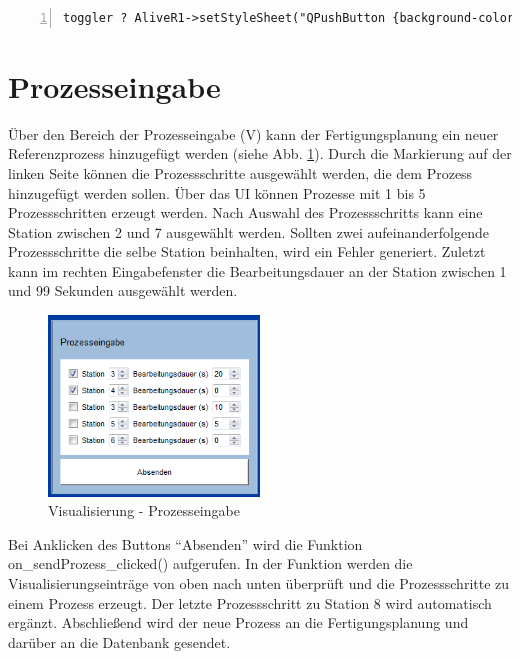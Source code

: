 \begin{lstlisting}[frame=single, breaklines=true, numbers=left, stepnumber=2, firstnumber=1, numberstyle = \tiny, caption=Stylesheet Aktualisierung der Alive-LED ,label=lst:LEDtoggle]
toggler ? AliveR1->setStyleSheet("QPushButton {background-color: rgb(0,250,50); border-radius: 6px;}") : AliveR1->setStyleSheet("QPushButton {background-color: green; border-radius: 6px;}");
\end{lstlisting}

\section{Prozesseingabe}
\label{sec:Prozesseingabe}

Über den Bereich der Prozesseingabe (V) kann der Fertigungsplanung ein neuer Referenzprozess hinzugefügt werden (siehe Abb. \ref{fig:Prozesseingabe}). Durch die Markierung auf der linken Seite können die Prozessschritte ausgewählt werden, die dem Prozess hinzugefügt werden sollen. Über das UI können Prozesse mit 1 bis 5 Prozessschritten erzeugt werden. Nach Auswahl des Prozessschritts kann eine Station zwischen 2 und 7 ausgewählt werden. Sollten zwei aufeinanderfolgende Prozessschritte die selbe Station beinhalten, wird ein Fehler generiert. Zuletzt kann im rechten Eingabefenster die Bearbeitungsdauer an der Station zwischen 1 und 99 Sekunden ausgewählt werden.

\begin{figure}[htb]
    \centering
    \includegraphics[width=0.5\textwidth]{Abbildungen/Prozesseingabe.png}
    \caption{Visualisierung - Prozesseingabe}		
    \label{fig:Prozesseingabe}
\end{figure}

Bei Anklicken des Buttons "`Absenden"' wird die Funktion on\_sendProzess\_clicked() aufgerufen. In der Funktion werden die Visualisierungseinträge von oben nach unten überprüft und die Prozessschritte zu einem Prozess erzeugt. Der letzte Prozessschritt zu Station 8 wird automatisch ergänzt. Abschließend wird der neue Prozess an die Fertigungsplanung und darüber an die Datenbank gesendet. 

